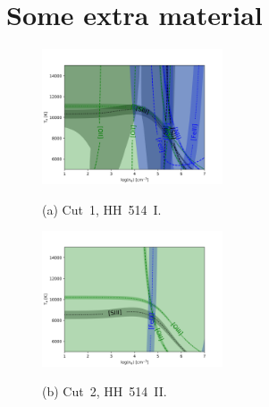 \documentclass[fleqn,usenatbib]{mnras}
\begin{document}






\newpage


\appendix


\section{Some extra material}

\begin{figure}
  \begin{minipage}{7.5cm}
    \centering\includegraphics[height=4cm,width=\columnwidth]{HH514I.png}
    \centerline{(a) Cut~1, HH~514~I.}
  \end{minipage}
  \begin{minipage}{7.5cm}
     \centering\includegraphics[height=4cm,width=\columnwidth]{HH514II.png}
    \centerline{(b) Cut~2, HH~514~II.}
  \end{minipage}
 

\end{figure}
\end{document}
